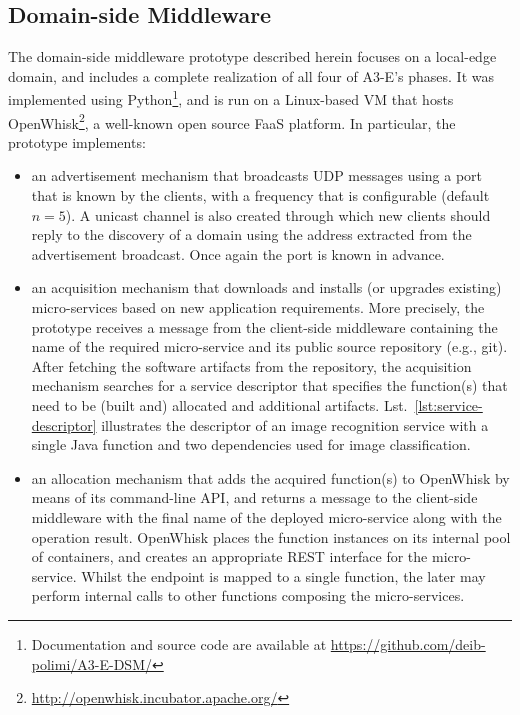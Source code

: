 \subsection{Domain-side Middleware}


The domain-side middleware prototype described herein focuses on a local-edge domain, and includes a complete realization of all four of A3-E's phases. It was implemented using Python\footnote{Documentation and source code are available at \url{https://github.com/deib-polimi/A3-E-DSM/}}, and is run on a Linux-based VM that hosts OpenWhisk\footnote{\url{http://openwhisk.incubator.apache.org/}}, a well-known open source FaaS platform. In particular, the prototype implements:

\begin{itemize}

	\item an advertisement mechanism that broadcasts UDP messages using a port that is known by the clients, with a frequency that is configurable (default $n=5$). A unicast channel is also created through which new clients should reply to the discovery of a domain using the address extracted from the advertisement broadcast. Once again the port is known in advance.

	\item an acquisition mechanism that downloads and installs (or upgrades existing) micro-services based on new application requirements. More precisely, the prototype receives a message from the client-side middleware containing the name of the required micro-service and its public source repository (e.g., git). After fetching the software artifacts from the repository, the acquisition mechanism searches for a service descriptor that specifies the function(s) that need to be (built and) allocated and additional artifacts. Lst.~\ref{lst:service-descriptor} illustrates the descriptor of an image recognition service with a single Java function and two dependencies used for image classification.

	\item an allocation mechanism that adds the acquired function(s) to OpenWhisk by means of its command-line API, and returns a message to the client-side middleware with the final name of the deployed micro-service along with the operation result. OpenWhisk places the function instances on its internal pool of containers, and creates an appropriate REST interface for the micro-service. Whilst the endpoint is mapped to a single function, the later may perform internal calls to other functions composing the micro-services.

\end{itemize}

